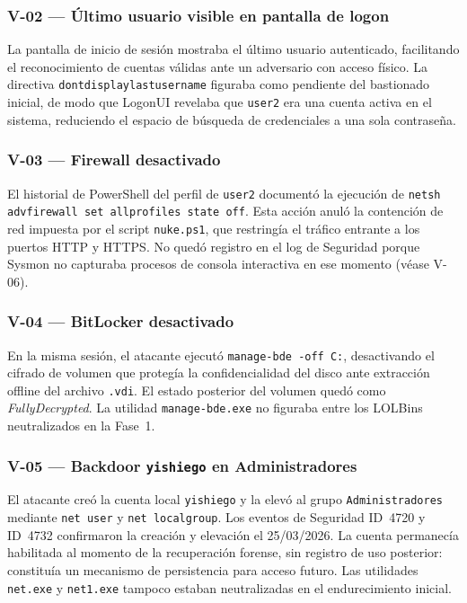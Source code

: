 \subsubsection{V-02 --- Último usuario visible en pantalla de logon}
La pantalla de inicio de sesión mostraba el último usuario autenticado, facilitando el reconocimiento de cuentas válidas ante un adversario con acceso físico. La directiva \texttt{dontdisplay}\allowbreak\texttt{lastusername} figuraba como pendiente del bastionado inicial, de modo que LogonUI revelaba que \texttt{user2} era una cuenta activa en el sistema, reduciendo el espacio de búsqueda de credenciales a una sola contraseña.

\subsubsection{V-03 --- Firewall desactivado}
El historial de PowerShell del perfil de \texttt{user2} documentó la ejecución de \texttt{netsh advfirewall}\allowbreak\texttt{ set allprofiles state off}. Esta acción anuló la contención de red impuesta por el script \texttt{nuke.ps1}, que restringía el tráfico entrante a los puertos HTTP y HTTPS. No quedó registro en el log de Seguridad porque Sysmon no capturaba procesos de consola interactiva en ese momento (véase V-06).

\subsubsection{V-04 --- BitLocker desactivado}
En la misma sesión, el atacante ejecutó \texttt{manage-bde -off C:}, desactivando el cifrado de volumen que protegía la confidencialidad del disco ante extracción offline del archivo \texttt{.vdi}. El estado posterior del volumen quedó como \textit{FullyDecrypted}. La utilidad \texttt{manage-bde.exe} no figuraba entre los LOLBins neutralizados en la Fase~1.

\subsubsection{V-05 --- Backdoor \texttt{yishiego} en Administradores}
El atacante creó la cuenta local \texttt{yishiego} y la elevó al grupo \texttt{Administradores} mediante \texttt{net user} y \texttt{net localgroup}. Los eventos de Seguridad ID~4720 y ID~4732 confirmaron la creación y elevación el 25/03/2026. La cuenta permanecía habilitada al momento de la recuperación forense, sin registro de uso posterior: constituía un mecanismo de persistencia para acceso futuro. Las utilidades \texttt{net.exe} y \texttt{net1.exe} tampoco estaban neutralizadas en el endurecimiento inicial.

